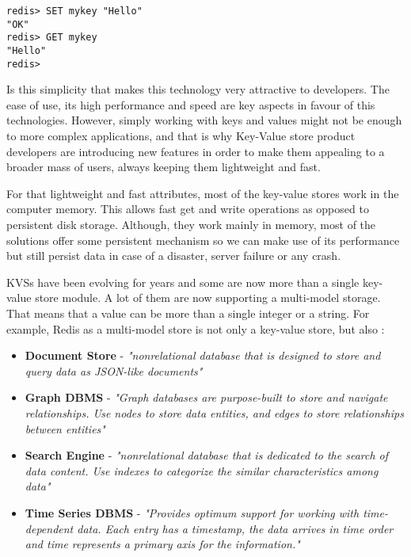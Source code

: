 \lstset{language=Bash, caption=Redis Set \& Get, label=lst:redisSetGet}
\begin{lstlisting}
redis> SET mykey "Hello"
"OK"
redis> GET mykey
"Hello"
redis> 
\end{lstlisting}

Is this simplicity that makes this technology very attractive to developers. The ease of use, its high performance and speed are key aspects in favour of this technologies. However, simply working with keys and values might not be enough to more complex applications, and that is why Key-Value store product developers are introducing new features in order to make them appealing to a broader mass of users, always keeping them lightweight and fast.

For that lightweight and fast attributes, most of the key-value stores work in the computer memory. This allows fast get and write operations as opposed to persistent disk storage. Although, they work mainly in memory, most of the solutions offer some persistent mechanism so we can make use of its performance but still persist data in case of a disaster, server failure or any crash.

\gls{KVS}s have been evolving for years and some are now more than a single key-value store module. A lot of them are now supporting a multi-model storage. That means that a value can be more than a single integer or a string. For example, Redis \cite{redis:1} as a multi-model store is not only a key-value store, but also \cite{redis:2}:

\begin{itemize}
	\item \textbf{Document Store} - \textit{"nonrelational database that is designed to store and query data as JSON-like documents"} \cite{aws-nosql:1}
	\item \textbf{Graph \gls{DBMS}} - \textit{"Graph databases are purpose-built to store and navigate relationships. Use nodes to store data entities, and edges to store relationships between entities"} \cite{aws-nosql:2} 
	\item \textbf{Search Engine} - \textit{"nonrelational database that is dedicated to the search of data content. Use indexes to categorize the similar characteristics among data"} \cite{aws-nosql:3} 
	\item \textbf{Time Series \gls{DBMS}} - \textit{"Provides optimum support for working with time-dependent data. Each entry has a timestamp, the data arrives in time order and time represents a primary axis for the information."} \cite{timeSeries:1}
\end{itemize}

